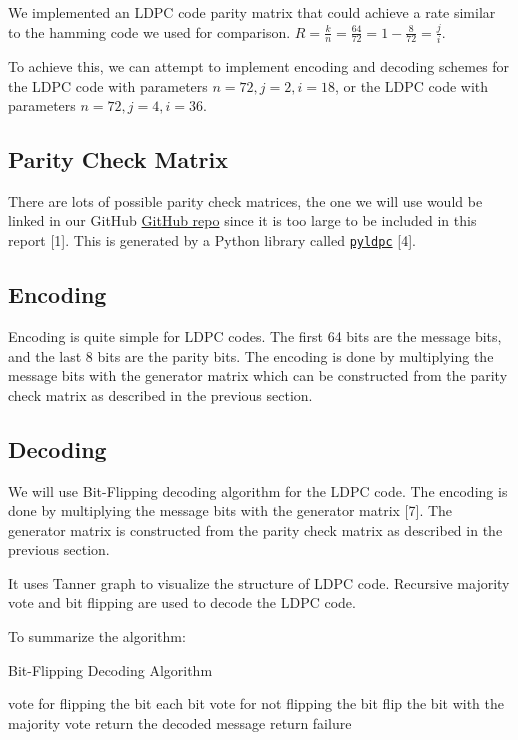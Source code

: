 \documentclass[conference]{IEEEtran}
\begin{document}
We implemented an LDPC code parity matrix that could achieve a rate similar to
the hamming code we used for comparison.
$R=\frac{k}{n}=\frac{64}{72}=1-\frac{8}{72} = \frac{j}{i}$.

To achieve this, we can attempt to implement encoding and decoding schemes for
the LDPC code with parameters $n=72, j=2, i=18$, or the LDPC code with
parameters $n=72, j=4, i=36$.
\subsection{Parity Check Matrix}
There are lots of possible parity check matrices, the one we will use would be linked in our GitHub \href{https://hichamjanati.github.io/pyldpc/}{GitHub repo} since it is too large to be included in this report [1]. This is generated by a Python library called \href{https://hichamjanati.github.io/pyldpc/}{\texttt{pyldpc}} [4].
\subsection{Encoding}
Encoding is quite simple for LDPC codes. The first 64 bits are the message bits, and the last 8 bits are the parity bits. The encoding is done by multiplying the message bits with the generator matrix which can be constructed from the parity check matrix as described in the previous section.
\subsection{Decoding}
We will use Bit-Flipping decoding algorithm for the LDPC code. The encoding is done by multiplying the message bits with the generator matrix [7]. The generator matrix is constructed from the parity check matrix as described in the previous section.

It uses Tanner graph to visualize the structure of LDPC code. Recursive majority vote and bit flipping are used to decode the LDPC code. 

To summarize the algorithm:
\begin{algorithm}
  \caption{Bit-Flipping Decoding Algorithm}
  \begin{algorithmic}
          \STATE vote for flipping the bit
        \ELSE
        \ENDIF
      \ENDFOR
      \STATE each bit vote for not flipping the bit
      \STATE flip the bit with the majority vote
    \ENDWHILE
    \STATE return the decoded message
    \ELSE
    \STATE return failure
    \ENDIF
  \end{algorithmic}
\end{algorithm}
\end{document}
